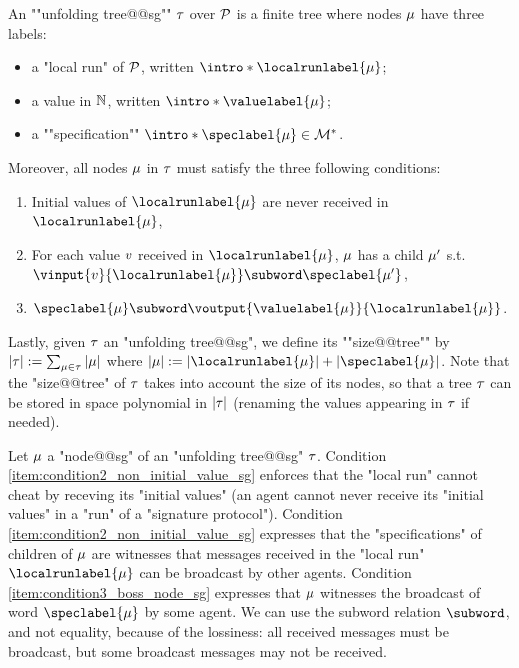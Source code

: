 \begin{definition}
\label{def:unfolding_tree_signature}
\AP An ""unfolding tree@@sg"" $\tau$ over $\mathcal{P}$ is
a finite tree where nodes $\mu$ have three labels:
\begin{itemize}
	\item a "local run" of $\mathcal{P}$, written $\intro*\localrunlabel{\node}$;
	
	\item a value in $\mathbb{N}$, written $\intro*\valuelabel{\node}$;
	
	\item a ""specification"" $\intro*\speclabel{\node} \in \messages^*$.
\end{itemize} 
Moreover, all nodes $\mu$ in $\tau$ must satisfy the three following conditions:
\begin{enumerate}[label= (\roman*), ref=(\roman*)]
	\item \label{item:condition1_initial_value_sg} Initial values of $\localrunlabel{\node}$ are never received in $\localrunlabel{\node}$,
	\item \label{item:condition2_non_initial_value_sg} For each value $v$ received in $\localrunlabel{\node}$, $\mu$ has a child $\mu'$ s.t. $\vinput{\aval}{\localrunlabel{\node}} \subword \speclabel{\node'}$,
	\item \label{item:condition3_boss_node_sg} $\speclabel{\node} \subword \voutput{\valuelabel{\node}}{\localrunlabel{\node}}$.
\end{enumerate}

\AP Lastly, given $\tau$ an "unfolding tree@@sg", we define its ""size@@tree"" by $|\tau| := \sum_{\mu \in \tau} |\mu|$ where $\size{\node} := \size{\localrunlabel{\node}} + \size{\speclabel{\node}}$. Note that the "size@@tree" of $\tau$ takes into account the size of its nodes, so that a tree $\tau$ can be stored in space polynomial in $|\tau|$ (renaming the values appearing in $\tau$ if needed). 
\end{definition}
Let $\mu$ a "node@@sg" of an "unfolding tree@@sg" $\tau$. Condition \ref{item:condition2_non_initial_value_sg} enforces that the "local run" cannot cheat by receving its "initial values" (an agent cannot never receive its "initial values" in a "run" of a "signature protocol"). 
Condition \ref{item:condition2_non_initial_value_sg} expresses that the "specifications" of children of $\mu$ are witnesses that messages received in the "local run" $\localrunlabel{\node}$ can be broadcast by other agents. Condition \ref{item:condition3_boss_node_sg} expresses that $\mu$ witnesses the broadcast of word $\speclabel{\node}$ by some agent. We can use the subword relation $\subword$, and not equality, because of the lossiness: all received messages must be broadcast, but some broadcast messages may not be received.  

